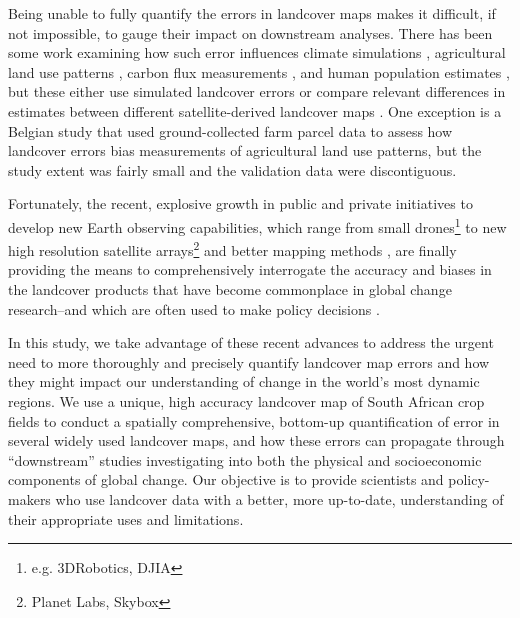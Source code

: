 \documentclass{pnastwo}
\begin{document}
\begin{article}
Being unable to fully quantify the errors in landcover maps makes it difficult, if not impossible, to gauge their impact on downstream analyses. There has been some work examining how such error influences climate simulations \cite{ge_impacts_2007}, agricultural land use patterns \cite{schmit_limitations_2006}, carbon flux measurements \cite{quaife_impact_2008}, and human population estimates \cite{linard_assessing_2010}, but these either use simulated landcover errors \cite{ge_impacts_2007} or compare relevant differences in estimates between different satellite-derived landcover maps \cite{linard_assessing_2010, quaife_impact_2008}. One exception is a Belgian study \cite{schmit_limitations_2006} that used ground-collected farm parcel data to assess how landcover errors bias measurements of agricultural land use patterns, but the study extent was fairly small and the validation data were discontiguous. 

Fortunately, the recent, explosive growth in public and private initiatives to develop new Earth observing capabilities, which range from small drones\footnote{e.g. 3DRobotics, DJIA} to new high resolution satellite arrays\footnote{Planet Labs, Skybox} and better mapping methods \cite{fritz_geo-wiki:_2012,estes_projected_2013,debats_generalized_????}, are finally providing the means to comprehensively interrogate the accuracy and biases in the landcover products that have become commonplace in global change research--and which are often used to make policy decisions \cite{searchinger_high_2015}.  

In this study, we take advantage of these recent advances to address the urgent need to more thoroughly and precisely quantify landcover map errors and how they might impact our understanding of change in the world's most dynamic regions.  We use a unique, high accuracy landcover map of South African crop fields to conduct a spatially comprehensive, bottom-up quantification of error in several widely used landcover maps, and how these errors can propagate through ``downstream'' studies investigating into both the physical and socioeconomic components of global change. Our objective is to provide scientists and policy-makers who use landcover data with a better, more up-to-date, understanding of their appropriate uses and limitations. 

\vspace{-0.5 cm}

\end{article}
\end{document}
